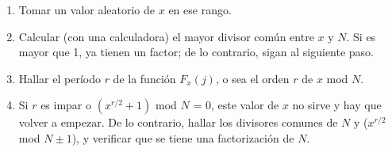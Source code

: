 \documentclass[a4paper,11pt,spanish]{article}
\begin{document}
\begin{enumerate}
 \begin{enumerate}
  \item Tomar un valor aleatorio de $x$ en ese rango.
  \item Calcular (con una calculadora) el mayor divisor común entre $x$ y $N$. Si es mayor que 1, ya tienen un factor; de lo contrario, sigan al siguiente paso.
  \item Hallar el período $r$ de la función $F_x(j)$, o sea el orden $r$ de $x$ mod $N$.
  \item Si $r$ es impar o $(x^{r/2}+1)$ mod $N$ = 0, este valor de $x$ no sirve y hay que volver a empezar. De lo contrario, hallar los divisores comunes de $N$ y ($x^{r/2}$ mod $N \pm 1$), y verificar que se tiene una factorización de $N$.
 \end{enumerate}

\end{enumerate}
\end{document}
